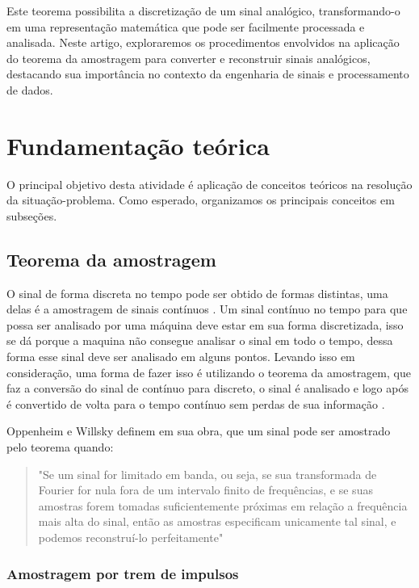 \documentclass[journal]{IEEEtran}
\begin{document}
Este teorema possibilita a discretização de um sinal analógico, transformando-o em uma representação matemática que pode ser facilmente processada e analisada. Neste artigo, exploraremos os procedimentos envolvidos na aplicação do teorema da amostragem para converter e reconstruir sinais analógicos, destacando sua importância no contexto da engenharia de sinais e processamento de dados.

\section{Fundamentação teórica}

O principal objetivo desta atividade é aplicação de conceitos teóricos na resolução da situação-problema. Como esperado, organizamos os principais conceitos em subseções.

\subsection{Teorema da amostragem}

O sinal de forma discreta no tempo pode ser obtido de formas distintas, uma delas é a amostragem de sinais contínuos \cite{Oppenheim}. Um sinal contínuo no tempo para que possa ser analisado por uma máquina deve estar em sua forma discretizada, isso se dá porque a maquina não consegue analisar o sinal em todo o tempo, dessa forma esse sinal deve ser analisado em alguns pontos. Levando isso em consideração, uma forma de fazer isso é utilizando o teorema da amostragem, que faz a conversão do sinal de contínuo para discreto, o sinal é analisado e logo após é convertido de volta para o tempo contínuo sem perdas de sua informação \cite{alan} \cite{Oppenheim}.

Oppenheim e Willsky \cite{alan} definem em sua obra, que um sinal pode ser amostrado pelo teorema quando: 
\begin{quote}
    "Se um sinal for limitado em banda, ou seja, se sua transformada de Fourier for nula fora de um intervalo finito de frequências, e se suas amostras forem tomadas suficientemente próximas em relação a frequência mais alta do sinal, então as amostras especificam unicamente tal sinal, e podemos reconstruí-lo perfeitamente"
\end{quote}

\subsubsection{Amostragem por trem de impulsos}
\end{document}
